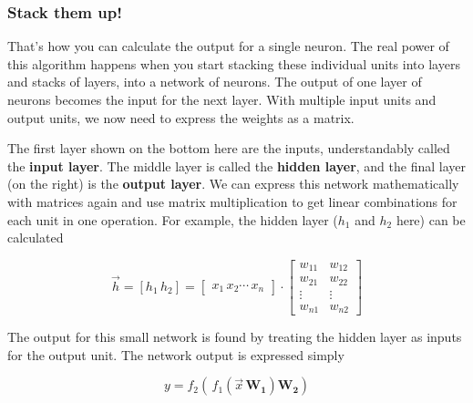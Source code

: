 \documentclass[11pt]{article}
\begin{document}
    \subsubsection{Stack them up!}\label{stack-them-up}

That's how you can calculate the output for a single neuron. The real
power of this algorithm happens when you start stacking these individual
units into layers and stacks of layers, into a network of neurons. The
output of one layer of neurons becomes the input for the next layer.
With multiple input units and output units, we now need to express the
weights as a matrix.

The first layer shown on the bottom here are the inputs, understandably
called the \textbf{input layer}. The middle layer is called the
\textbf{hidden layer}, and the final layer (on the right) is the
\textbf{output layer}. We can express this network mathematically with
matrices again and use matrix multiplication to get linear combinations
for each unit in one operation. For example, the hidden layer (\(h_1\)
and \(h_2\) here) can be calculated

\[
\vec{h} = [h_1 \, h_2] = 
\begin{bmatrix}
x_1 \, x_2 \cdots \, x_n
\end{bmatrix}
\cdot 
\begin{bmatrix}
           w_{11} & w_{12} \\
           w_{21} &w_{22} \\
           \vdots &\vdots \\
           w_{n1} &w_{n2}
\end{bmatrix}
\]

The output for this small network is found by treating the hidden layer
as inputs for the output unit. The network output is expressed simply

\[
y =  f_2 \! \left(\, f_1 \! \left(\vec{x} \, \mathbf{W_1}\right) \mathbf{W_2} \right)
\]
\end{document}
